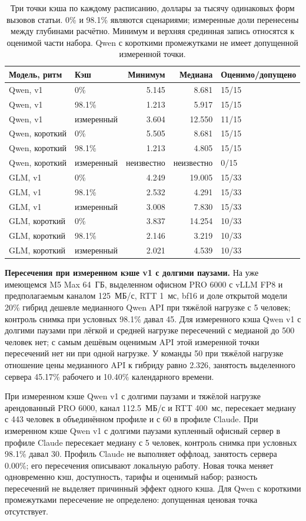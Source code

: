 \begin{table}[t]
\centering
\caption{Три точки кэша по каждому расписанию, доллары за тысячу одинаковых форм вызовов статьи.
0\% и 98.1\% являются сценариями; измеренные доли перенесены между глубинами расчётно.
Минимум и верхняя срединная запись относятся к оценимой части набора. Qwen с короткими промежутками не имеет допущенной измеренной точки.}
\label{tab:r24-api-points}
\footnotesize
\begin{tabular}{llrrl}
\toprule
Модель, ритм & Кэш & Минимум & Медиана & Оценимо/допущено \\
\midrule
Qwen, v1 & 0\% & 5.145 & 8.681 & 15/15 \\
Qwen, v1 & 98.1\% & 1.213 & 5.917 & 15/15 \\
Qwen, v1 & измеренный & 3.604 & 12.550 & 11/15 \\
Qwen, короткий & 0\% & 5.505 & 8.681 & 15/15 \\
Qwen, короткий & 98.1\% & 1.213 & 4.805 & 15/15 \\
Qwen, короткий & измеренный & неизвестно & неизвестно & 0/15 \\
GLM, v1 & 0\% & 4.249 & 19.005 & 15/33 \\
GLM, v1 & 98.1\% & 2.532 & 4.291 & 15/33 \\
GLM, v1 & измеренный & 3.008 & 7.830 & 15/33 \\
GLM, короткий & 0\% & 3.837 & 14.254 & 10/33 \\
GLM, короткий & 98.1\% & 2.146 & 3.219 & 10/33 \\
GLM, короткий & измеренный & 2.021 & 4.539 & 10/33 \\
\bottomrule
\end{tabular}
\end{table}

\textbf{Пересечения при измеренном кэше v1 с долгими паузами.} На уже имеющемся M5 Max 64~ГБ,
выделенном офисном PRO 6000 с vLLM FP8 и предполагаемым каналом 125~МБ/с, RTT 1~мс,
bf16 и доле открытой модели 20\% гибрид дешевле медианного Qwen API при тяжёлой нагрузке с 5 человек;
контроль снимка при условных 98.1\% давал 45. Для измеренного кэша Qwen v1 с долгими паузами
при лёгкой и средней нагрузке пересечений с медианой до 500 человек нет;
с самым дешёвым оценимым API этой измеренной точки пересечений нет ни при одной нагрузке.
У команды 50 при тяжёлой нагрузке отношение цены медианного API к гибриду равно 2.326,
занятость выделенного сервера 45.17\% рабочего и 10.40\% календарного времени.

При измеренном кэше Qwen v1 с долгими паузами и тяжёлой нагрузке арендованный PRO 6000,
канал 112.5~МБ/с и RTT 400~мс, пересекает медиану с 443 человек в объединённом профиле и с 60 в профиле Claude.
При измеренном кэше Qwen v1 с долгими паузами купленный офисный сервер в профиле Claude пересекает медиану с 5 человек,
контроль снимка при условных 98.1\% давал 30. Профиль Claude не выполняет оффлоад, занятость сервера 0.00\%;
его пересечения описывают локальную работу. Новая точка меняет одновременно кэш, доступность, тарифы и оценимый набор;
разность пересечений не выделяет причинный эффект одного кэша. Для Qwen с короткими промежутками пересечение не определено:
допущенная ценовая точка отсутствует.

